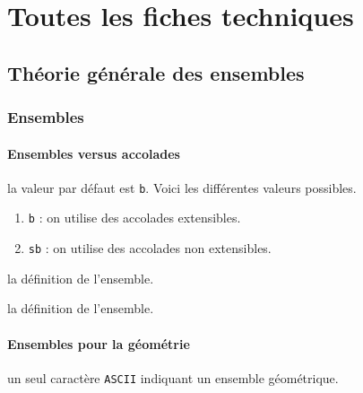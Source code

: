 \documentclass[12pt,a4paper]{book}
\theoremstyle{definition}
\newcommand\ascii{\texttt{ASCII}}
\begin{document}
{{\newpage
\chapter{Toutes les fiches techniques} \label{techincal-ids}



















\section{Théorie générale des ensembles}

\subsection{Ensembles}

\subsubsection{Ensembles versus accolades}




\IDoption{} la valeur par défaut est \verb+b+.  Voici les différentes valeurs possibles.
\begin{enumerate}
	\item \verb+b+ : on utilise des accolades extensibles.

	\item \verb+sb+ : on utilise des accolades non extensibles.
\end{enumerate}

\IDarg{} la définition de l'ensemble.

\IDarg{} la définition de l'ensemble.




\subsubsection{Ensembles pour la géométrie} \label{set-geo}




\IDarg{} un seul caractère \ascii{} indiquant un ensemble géométrique.


}}
\end{document}

